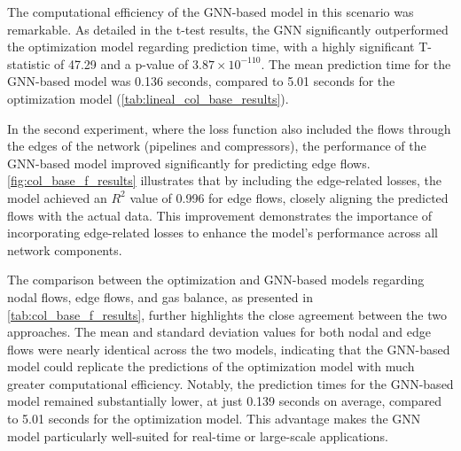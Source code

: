 The computational efficiency of the GNN-based model in this scenario was remarkable. As detailed in the t-test results, the GNN significantly outperformed the optimization model regarding prediction time, with a highly significant T-statistic of 47.29 and a p-value of $3.87 \times 10^{-110}$. The mean prediction time for the GNN-based model was 0.136 seconds, compared to 5.01 seconds for the optimization model (\cref{tab:lineal_col_base_results}). 

In the second experiment, where the loss function also included the flows through the edges of the network (pipelines and compressors), the performance of the GNN-based model improved significantly for predicting edge flows. \cref{fig:col_base_f_results} illustrates that by including the edge-related losses, the model achieved an $R^2$ value of 0.996 for edge flows, closely aligning the predicted flows with the actual data. This improvement demonstrates the importance of incorporating edge-related losses to enhance the model's performance across all network components.

The comparison between the optimization and GNN-based models regarding nodal flows, edge flows, and gas balance, as presented in \cref{tab:col_base_f_results}, further highlights the close agreement between the two approaches. The mean and standard deviation values for both nodal and edge flows were nearly identical across the two models, indicating that the GNN-based model could replicate the predictions of the optimization model with much greater computational efficiency. Notably, the prediction times for the GNN-based model remained substantially lower, at just 0.139 seconds on average, compared to 5.01 seconds for the optimization model. This advantage makes the GNN model particularly well-suited for real-time or large-scale applications.




